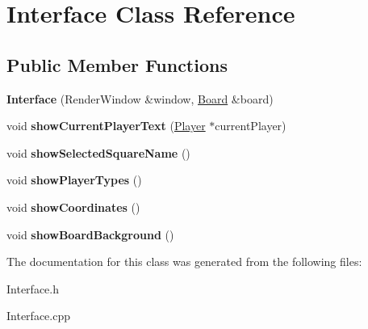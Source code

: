 \hypertarget{class_interface}{}\section{Interface Class Reference}
\label{class_interface}
\subsection*{Public Member Functions}
\begin{DoxyCompactItemize}
\item 
\mbox{\label{class_interface_afe5bec89bb6b1b22ac826169eff10b31}} 
{\bfseries Interface} (Render\+Window \&window, \mbox{\hyperlink{class_board}{Board}} \&board)
\item 
\mbox{\label{class_interface_a89d04c54dcf70d05c942b0e8ddce51f1}} 
void {\bfseries show\+Current\+Player\+Text} (\mbox{\hyperlink{class_player}{Player}} $\ast$current\+Player)
\item 
\mbox{\label{class_interface_a261b7350edcb97bf5deb61cb548a39e6}} 
void {\bfseries show\+Selected\+Square\+Name} ()
\item 
\mbox{\label{class_interface_a769d9f7977a2917fe7752b355e1946fa}} 
void {\bfseries show\+Player\+Types} ()
\item 
\mbox{\label{class_interface_af231aba8f4addf49b7e581bf99bb80cb}} 
void {\bfseries show\+Coordinates} ()
\item 
\mbox{\label{class_interface_a8991fc674d8298e9b9e83977a2c3386a}} 
void {\bfseries show\+Board\+Background} ()
\end{DoxyCompactItemize}


The documentation for this class was generated from the following files\+:\begin{DoxyCompactItemize}
\item 
Interface.\+h\item 
Interface.\+cpp\end{DoxyCompactItemize}
